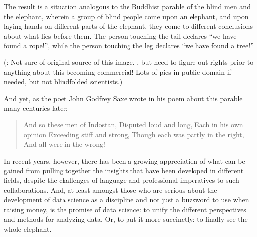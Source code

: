 \documentclass[letterpaper,10pt,english]{jupyterBook}
\begin{document}
\sphinxAtStartPar
The result is a situation analogous to the Buddhist parable of the blind men and the elephant, wherein a group of blind people come upon an elephant, and upon laying hands on different parts of the elephant, they come to different conclusions about what lies before them. The person touching the tail declares “we have found a rope!”, while the person touching the leg declares “we have found a tree!”

\sphinxAtStartPar
{}

\sphinxAtStartPar
(: Not sure of original source of this image. , but need to figure out rights prior to anything about this becoming commercial! Lots of pics in public domain if needed, but not blindfolded scientists.)

\sphinxAtStartPar
And yet, as the poet John Godfrey Saxe wrote in his poem  about this parable many centuries later:
\begin{quote}

\sphinxAtStartPar
And so these men of Indostan,
Disputed loud and long,
Each in his own opinion
Exceeding stiff and strong,
Though each was partly in the right,
And all were in the wrong!
\end{quote}

\sphinxAtStartPar
In recent years, however, there has been a growing appreciation of what can be gained from pulling together the insights that have been developed in different fields, despite the challenges of language and professional imperatives to such collaborations. And, at least amongst those who are serious about the development of data science as a discipline and not just a buzzword to use when raising money, is the promise of data science: to unify the different perspectives and methods for analyzing data. Or, to put it more succinctly: to finally see the whole elephant.
\end{document}
